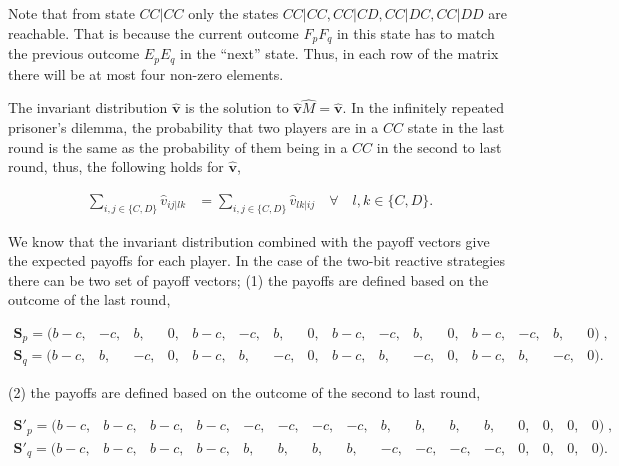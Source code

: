 \documentclass{article}
\theoremstyle{definition}
\begin{document}
Note that from state \(CC|CC\) only the states \(CC|CC, CC|CD, CC|DC, CC|DD\)
are reachable. That is because the current outcome \(F_p F_q\) in this state has
to match the previous outcome \(E_p E_q\) in the ``next'' state. Thus, in each
row of the matrix there will be at most four non-zero elements.

The invariant distribution \(\mathbf{\hat{v}}\) is the solution to
\(\mathbf{\hat{v}} \hat{M} = \mathbf{\hat{v}}\). In the infinitely
repeated prisoner's dilemma, the probability that two players are in a \(CC\)
state in the last round is the same as the probability of them being in a \(CC\)
in the second to last round, thus, the following holds for
\(\mathbf{\hat{v}}\),

\begin{align}\label{eq:last_rounds_equality}
  \sum_{i, j \in \{C, D\}} \hat{v}_{i j | l k} & = \sum_{i, j \in \{C, D\}} \hat{v}_{l k | ij} \quad \forall \quad l, k \in \{C, D\}.
\end{align}

We know that the invariant distribution combined with the payoff vectors give
the expected payoffs for each player. In the case of the two-bit reactive
strategies there can be two set of payoff vectors; (1) the payoffs are
defined based on the outcome of the last round,

\begin{equation}\label{eq:last_round_two_bits}
  \begin{array}{*{16}{c}}
    \mathbf{S}_{p} = ( b\!-\!c , & -c , & b , & 0 , & b\!-\!c , & -c , & b , & 0 , & b\!-\!c , & -c , & b , & 0 , & b\!-\!c , & -c , & b , & 0)  \;, \\
    \mathbf{S}_{q} = ( b\!-\!c, & b, & -c, & 0, & b\!-\!c, & b, & -c, & 0, & b\!-\!c, & b, & -c, & 0, & b\!-\!c, & b, & -c, & 0).
  \end{array}
\end{equation}

(2) the payoffs are defined based on the outcome of the second to last round,

\begin{equation}\label{eq:second_to_last_round_two_bits}
  \begin{array}{*{16}{c}}
    \mathbf{S}'_{p} = (b\!-\!c, & b\!-\!c, & b\!-\!c, & b\!-\!c, & -c, & -c, & -c, & -c, & b, & b, & b, & b, & 0, & 0, & 0, & 0)  \;, \\
    \mathbf{S}'_{q} = (b\!-\!c, & b\!-\!c, & b\!-\!c, & b\!-\!c, & b, & b, & b, & b, & -c, & -c, & -c, & -c, & 0, & 0, & 0, & 0).
  \end{array}
\end{equation}
\end{document}
